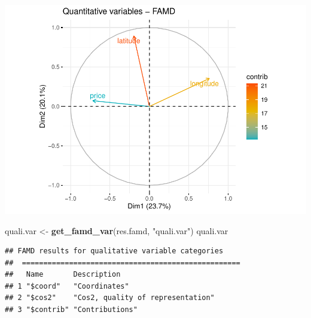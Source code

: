 \documentclass[
]{article}
\newenvironment{Shaded}{\begin{snugshade}}{\end{snugshade}}
\newcommand{\DataTypeTok}[1]{\textcolor[rgb]{0.13,0.29,0.53}{#1}}
\newcommand{\KeywordTok}[1]{\textcolor[rgb]{0.13,0.29,0.53}{\textbf{#1}}}
\newcommand{\NormalTok}[1]{#1}
\newcommand{\StringTok}[1]{\textcolor[rgb]{0.31,0.60,0.02}{#1}}
\begin{document}
\includegraphics{project-code_files/figure-latex/unnamed-chunk-35-1.pdf}

\begin{Shaded}
\begin{Highlighting}[]
\NormalTok{quali.var <-}\StringTok{ }\KeywordTok{get_famd_var}\NormalTok{(res.famd, }\StringTok{"quali.var"}\NormalTok{)}
\NormalTok{quali.var }
\end{Highlighting}
\end{Shaded}

\begin{verbatim}
## FAMD results for qualitative variable categories 
##  ===================================================
##   Name       Description                      
## 1 "$coord"   "Coordinates"                    
## 2 "$cos2"    "Cos2, quality of representation"
## 3 "$contrib" "Contributions"
\end{verbatim}

\begin{Shaded}
\end{Shaded}
\end{document}
